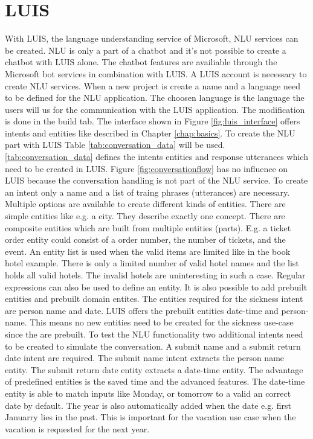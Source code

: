 \section{LUIS}
With LUIS\cite{luisdocs}, the language understanding service of Microsoft,
NLU services can be created.
NLU is only a part of a chatbot and it's not possible 
to create a chatbot with LUIS alone.
The chatbot features are availiable through the Microsoft bot services 
in combination with LUIS.
A LUIS account is necessary to create NLU services.
When a new project is create a name and a language need to be defined for 
the NLU application.
The choosen language is the language the users will us for the communication with the 
LUIS application.
The modification is done in the build tab.
The interface shown in Figure \ref{fig:luis_interface} offers intents and entities
like described in Chapter \ref{chap:basics}.
To create the NLU part with LUIS Table \ref{tab:conversation_data} will be used.
\ref{tab:conversation_data} defines the intents entities and response utterances
which need to be created in LUIS.
Figure \ref{fig:conversationflow} has no influence on LUIS because the 
conversation handling is not part of the NLU service.
To create an intent only a name and a list of traing phrases (utterances) are necessary.
Multiple options are available to create different kinds of entities.
There are simple entities like e.g. a city.
They describe exactly one concept.
There are composite entities which are built from multiple entities (parts).
E.g. a ticket order entity could consist of a order number, the number of 
tickets, and the event.
An entity list is used when the valid items are limited like in the book hotel example.
There is only a limited number of valid hotel names and the list holds all valid 
hotels.
The invalid hotels are uninteresting in such a case.
Regular expressions\cite{regex} can also be used to define an entity.
It is also possible to add prebuilt entities and prebuilt domain entites.
The entities required for the sickness intent are person name and date. 
LUIS offers the prebuilt entities date-time and person-name.
This means no new entities need to be created for the sickness use-case
since the are prebuilt.
To test the NLU functionality two additional intents need to be created to 
simulate the conversation.
A submit name and a submit return date intent are required.
The submit name intent extracts the person name entity.
The submit return date entity extracts a date-time entity.
The advantage of predefined entities is the saved time and the 
advanced features.
The date-time entity is able to match inputs like Monday, or tomorrow to 
a valid an correct date by default.
The year is also automatically added when the date e.g. first Januarry lies in the past.
This is important for the vacation use case when the vacation is requested for 
the next year. 


